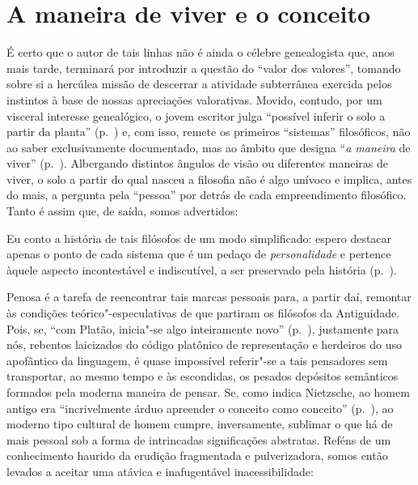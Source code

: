 \section{A maneira de viver e o conceito}

É certo que o autor de tais linhas não é ainda o célebre genealogista
que, anos mais tarde, terminará por introduzir a questão do
``valor dos valores'', tomando sobre si a
hercúlea missão de descerrar a atividade subterrânea exercida pelos
instintos à base de nossas apreciações valorativas. Movido, contudo,
por um visceral interesse genealógico, o jovem escritor julga
``possível inferir o solo a partir da
planta'' (p.~\pageref{possivelinferir}) e, com isso, remete
os primeiros ``sistemas'' filosóficos, não ao
saber exclusivamente documentado, mas ao âmbito que designa
``\textit{a maneira} de viver'' (p.~\pageref{amaneirade}). Albergando distintos ângulos de visão ou diferentes
maneiras de viver, o solo a partir do qual nasceu a filosofia não é
algo unívoco e implica, antes do mais, a pergunta pela
``pessoa'' por detrás de cada empreendimento
filosófico. Tanto é assim que, de saída, somos advertidos:

\begin{hedraquote}
Eu conto a história de tais filósofos de um modo simplificado:
espero destacar apenas o ponto de cada sistema que é um pedaço de
\textit{personalidade} e pertence àquele aspecto incontestável e
indiscutível, a ser preservado pela
história (p.~\pageref{simplificado}).
\end{hedraquote}

Penosa é a tarefa de reencontrar tais marcas pessoais para, a partir
daí, remontar às condições teórico"-especulativas de que partiram os
filósofos da Antiguidade. Pois, se, ``com Platão,
inicia"-se algo inteiramente novo'' (p.~\pageref{complatao}),
justamente para nós, rebentos laicizados do código platônico
de representação e herdeiros do uso apofântico da linguagem, é quase
impossível referir"-{}se a tais pensadores sem transportar, ao mesmo tempo e às
escondidas, os pesados depósitos semânticos formados pela moderna
maneira de pensar. Se, como indica Nietzsche, ao homem antigo era
``incrivelmente árduo apreender o conceito como
conceito'' (p.~\pageref{incrivelmentearduo}), ao moderno tipo
cultural de homem cumpre, inversamente, sublimar o que há de mais
pessoal sob a forma de intrincadas significações abstratas. Reféns de
um conhecimento haurido da erudição fragmentada e pulverizadora, somos
então levados a aceitar uma atávica e inafugentável inacessibilidade:

